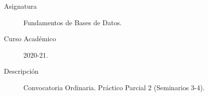\documentclass[12pt]{article}
\begin{document}

    
    

    \begin{description}
        \item[Asignatura] Fundamentos de Bases de Datos.
        \item[Curso Académico] 2020-21.
        \item[Descripción] Convocatoria Ordinaria. Práctico Parcial 2 (Seminarios 3-4).
    
    \end{description}
    \newpage
\end{document}

